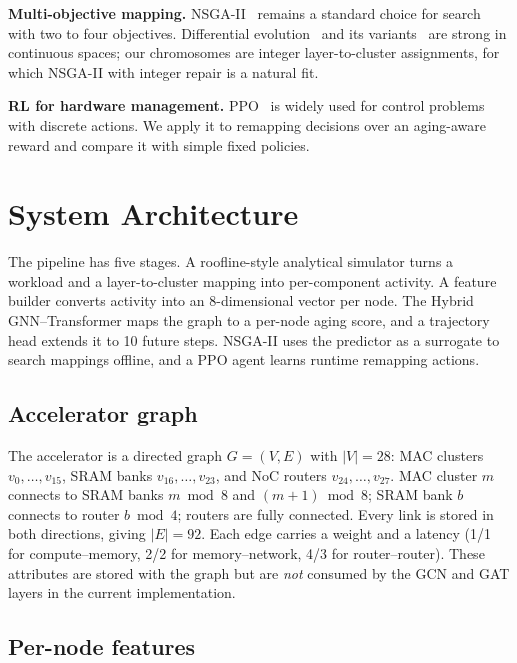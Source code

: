 \documentclass[conference]{IEEEtran}
\begin{document}
\textbf{Multi-objective mapping.} NSGA-II~\cite{deb2002nsga} remains a standard choice for search with two to four objectives. Differential evolution~\cite{storn1997de,das2016recent} and its variants~\cite{tang2015ide} are strong in continuous spaces; our chromosomes are integer layer-to-cluster assignments, for which NSGA-II with integer repair is a natural fit.

\textbf{RL for hardware management.} PPO~\cite{schulman2017ppo} is widely used for control problems with discrete actions. We apply it to remapping decisions over an aging-aware reward and compare it with simple fixed policies.

\section{System Architecture}
\label{sec:architecture}

The pipeline has five stages. A roofline-style analytical simulator turns a workload and a layer-to-cluster mapping into per-component activity. A feature builder converts activity into an 8-dimensional vector per node. The Hybrid GNN--Transformer maps the graph to a per-node aging score, and a trajectory head extends it to 10 future steps. NSGA-II uses the predictor as a surrogate to search mappings offline, and a PPO agent learns runtime remapping actions.

\subsection{Accelerator graph}
\label{sec:graph}

The accelerator is a directed graph $G = (V, E)$ with $|V| = 28$: MAC clusters $v_0,\ldots,v_{15}$, SRAM banks $v_{16},\ldots,v_{23}$, and NoC routers $v_{24},\ldots,v_{27}$. MAC cluster $m$ connects to SRAM banks $m \bmod 8$ and $(m+1) \bmod 8$; SRAM bank $b$ connects to router $b \bmod 4$; routers are fully connected. Every link is stored in both directions, giving $|E| = 92$. Each edge carries a weight and a latency (1/1 for compute--memory, 2/2 for memory--network, 4/3 for router--router). These attributes are stored with the graph but are \emph{not} consumed by the GCN and GAT layers in the current implementation.

\subsection{Per-node features}
\label{sec:features}
\end{document}
